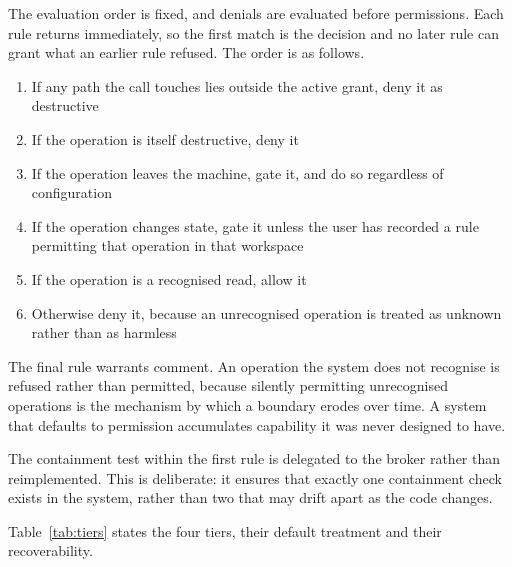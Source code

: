 \documentclass{FastFyp}
\begin{document}
The evaluation order is fixed, and denials are evaluated before permissions. Each rule returns immediately, so the first match is the decision and no later rule can grant what an earlier rule refused. The order is as follows.

\begin{enumerate}
    \item If any path the call touches lies outside the active grant, deny it as destructive
    \item If the operation is itself destructive, deny it
    \item If the operation leaves the machine, gate it, and do so regardless of configuration
    \item If the operation changes state, gate it unless the user has recorded a rule permitting that operation in that workspace
    \item If the operation is a recognised read, allow it
    \item Otherwise deny it, because an unrecognised operation is treated as unknown rather than as harmless
\end{enumerate}

The final rule warrants comment. An operation the system does not recognise is refused rather than permitted, because silently permitting unrecognised operations is the mechanism by which a boundary erodes over time. A system that defaults to permission accumulates capability it was never designed to have.

The containment test within the first rule is delegated to the broker rather than reimplemented. This is deliberate: it ensures that exactly one containment check exists in the system, rather than two that may drift apart as the code changes.

Table~\ref{tab:tiers} states the four tiers, their default treatment and their recoverability.
\end{document}
